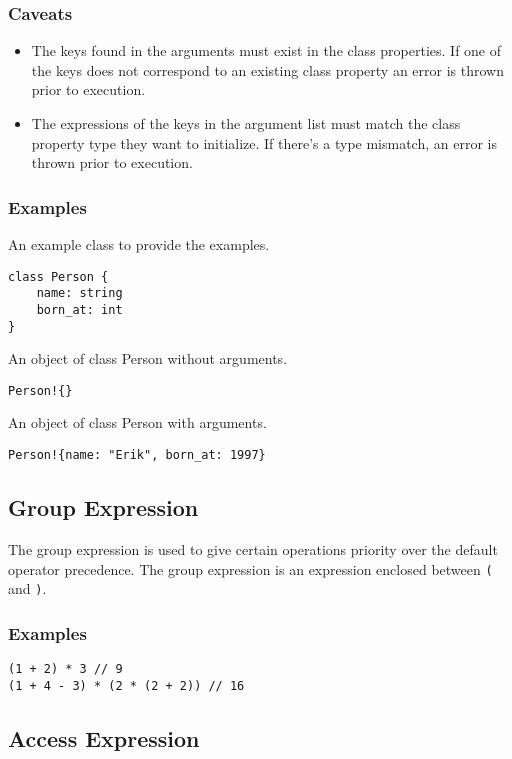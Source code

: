 \subsubsection{Caveats}

\begin{itemize}
    \item The keys found in the arguments must exist in the class properties. If one of the keys does not correspond to an existing class property an
        error is thrown prior to execution.
    \item The expressions of the keys in the argument list must match the class property type they want to initialize. If there's a type mismatch, an error
        is thrown prior to execution.
\end{itemize}

\subsubsection{Examples}

An example class to provide the examples.
\begin{lstlisting}
class Person {
    name: string
    born_at: int
}
\end{lstlisting}
An object of class Person without arguments.
\begin{lstlisting}
Person!{}
\end{lstlisting}
An object of class Person with arguments.
\begin{lstlisting}
Person!{name: "Erik", born_at: 1997}
\end{lstlisting}

\subsection{Group Expression}

The group expression is used to give certain operations priority over the default operator precedence.
The group expression is an expression enclosed between \texttt{(} and \texttt{)}.

\subsubsection{Examples}

\begin{lstlisting}
(1 + 2) * 3 // 9
(1 + 4 - 3) * (2 * (2 + 2)) // 16
\end{lstlisting}

\subsection{Access Expression}


